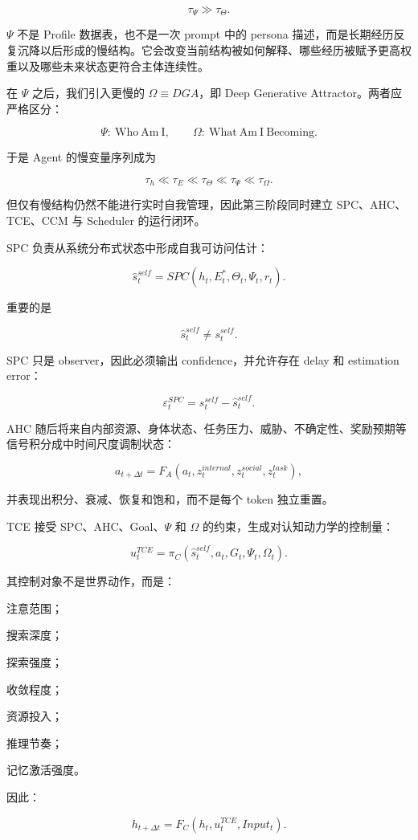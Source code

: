 \[
\tau_\Psi
\gg
\tau_\Theta.
\]

\(\Psi\) 不是 Profile 数据表，也不是一次 prompt 中的 persona 描述，而是长期经历反复沉降以后形成的慢结构。它会改变当前结构被如何解释、哪些经历被赋予更高权重以及哪些未来状态更符合主体连续性。

在 \(\Psi\) 之后，我们引入更慢的 \(\Omega\equiv DGA\)，即 Deep Generative Attractor。两者应严格区分：

\[
\Psi:\ \mathrm{Who\ Am\ I},
\qquad
\Omega:\ \mathrm{What\ Am\ I\ Becoming}.
\]

于是 Agent 的慢变量序列成为

\[
\tau_h
\ll
\tau_E
\ll
\tau_\Theta
\ll
\tau_\Psi
\ll
\tau_\Omega.
\]

但仅有慢结构仍然不能进行实时自我管理，因此第三阶段同时建立 SPC、AHC、TCE、CCM 与 Scheduler 的运行闭环。

SPC 负责从系统分布式状态中形成自我可访问估计：

\[
\hat s_t^{self}
=
SPC
\left(
h_t,
E_t^\ast,
\Theta_t,
\Psi_t,
r_t
\right).
\]

重要的是

\[
\hat s_t^{self}
\neq
s_t^{self}.
\]

SPC 只是 observer，因此必须输出 confidence，并允许存在 delay 和 estimation error：

\[
\varepsilon^{SPC}_t
=
s_t^{self}
-
\hat s_t^{self}.
\]

AHC 随后将来自内部资源、身体状态、任务压力、威胁、不确定性、奖励预期等信号积分成中时间尺度调制状态：

\[
a_{t+\Delta t}
=
F_A
(a_t,z_t^{internal},z_t^{social},z_t^{task}),
\]

并表现出积分、衰减、恢复和饱和，而不是每个 token 独立重置。

TCE 接受 SPC、AHC、Goal、\(\Psi\) 和 \(\Omega\) 的约束，生成对认知动力学的控制量：

\[
u_t^{TCE}
=
\pi_C
\left(
\hat s_t^{self},
a_t,
G_t,
\Psi_t,
\Omega_t
\right).
\]

其控制对象不是世界动作，而是：

注意范围；

搜索深度；

探索强度；

收敛程度；

资源投入；

推理节奏；

记忆激活强度。

因此：

\[
h_{t+\Delta t}
=
F_C
(h_t,u_t^{TCE},Input_t).
\]

